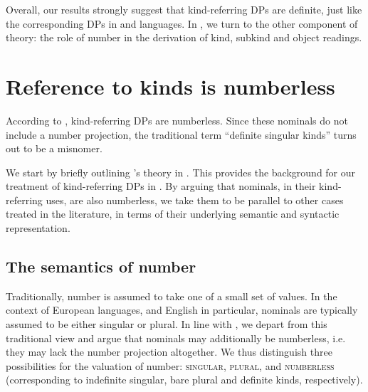 \documentclass[output=paper]{langscibook}
\begin{document}
Overall, our results strongly suggest that  kind-referring DPs are definite, just like the corresponding DPs in  and  languages. In , we turn to the other component of  theory: the role of number in the derivation of kind, subkind and object readings.


\section{Reference to kinds is numberless} \label{sec:3-nominals_numberless}

According to \citet{Borik.Espinal2012, Borik.Espinal2015}, kind-referring DPs are numberless. Since these nominals do not include a number projection, the traditional term ``definite singular kinds'' turns out to be a misnomer.

We start by briefly outlining \citeauthor{Borik.Espinal2012}'s theory in . This provides the background for our treatment of  kind-referring DPs in . By arguing that  nominals, in their kind-referring uses, are also numberless, we take them to be parallel to other cases treated in the literature, in terms of their underlying semantic and syntactic representation.

\subsection{The semantics of number}
\label{sec:sem_num}

Traditionally, number is assumed to take one of a small set of values. In the context of European languages, and English in particular, nominals are typically assumed to be either singular or plural. In line with \citet{Borik.Espinal2012, Borik.Espinal2015}, we depart from this traditional view and argue that nominals may additionally be numberless, i.e. they may lack the number projection altogether. We thus distinguish three possibilities for the valuation of number: \textsc{singular}, \textsc{plural}, and \textsc{numberless} (corresponding to indefinite singular, bare plural and definite kinds, respectively).
\end{document}
